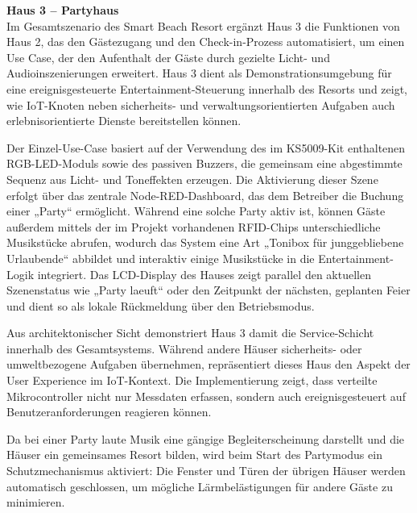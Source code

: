 
\vspace{0.5em}
\textbf{Haus 3 – Partyhaus}\\
Im Gesamtszenario des Smart Beach Resort ergänzt Haus 3 die Funktionen von Haus 2, das den Gästezugang und den Check-in-Prozess automatisiert, um einen Use Case, der den Aufenthalt der Gäste durch gezielte Licht- und Audioinszenierungen erweitert. Haus 3 dient als Demonstrationsumgebung für eine ereignisgesteuerte Entertainment-Steuerung innerhalb des Resorts und zeigt, wie IoT-Knoten neben sicherheits- und verwaltungsorientierten Aufgaben auch erlebnisorientierte Dienste bereitstellen können.

Der Einzel-Use-Case basiert auf der Verwendung des im KS5009-Kit enthaltenen RGB-LED-Moduls sowie des passiven Buzzers, die gemeinsam eine abgestimmte Sequenz aus Licht- und Toneffekten erzeugen. Die Aktivierung dieser Szene erfolgt über das zentrale Node-RED-Dashboard, das dem Betreiber die Buchung einer „Party“ ermöglicht. Während eine solche Party aktiv ist, können Gäste außerdem mittels der im Projekt vorhandenen RFID-Chips unterschiedliche Musikstücke abrufen, wodurch das System eine Art „Tonibox für junggebliebene Urlaubende“ abbildet und interaktiv einige Musikstücke in die Entertainment-Logik integriert. Das LCD-Display des Hauses zeigt parallel den aktuellen Szenenstatus wie „Party laeuft“ oder den Zeitpunkt der nächsten, geplanten Feier und dient so als lokale Rückmeldung über den Betriebsmodus.

Aus architektonischer Sicht demonstriert Haus 3 damit die Service-Schicht innerhalb des Gesamtsystems. Während andere Häuser sicherheits- oder umweltbezogene Aufgaben übernehmen, repräsentiert dieses Haus den Aspekt der User Experience  im IoT-Kontext. Die Implementierung zeigt, dass verteilte Mikrocontroller nicht nur Messdaten erfassen, sondern auch ereignisgesteuert auf Benutzeranforderungen reagieren können.

Da bei einer Party laute Musik eine gängige Begleiterscheinung darstellt und die Häuser ein gemeinsames Resort bilden, wird beim Start des Partymodus ein Schutzmechanismus aktiviert: Die Fenster und Türen der übrigen Häuser werden automatisch geschlossen, um mögliche Lärmbelästigungen für andere Gäste zu minimieren.

